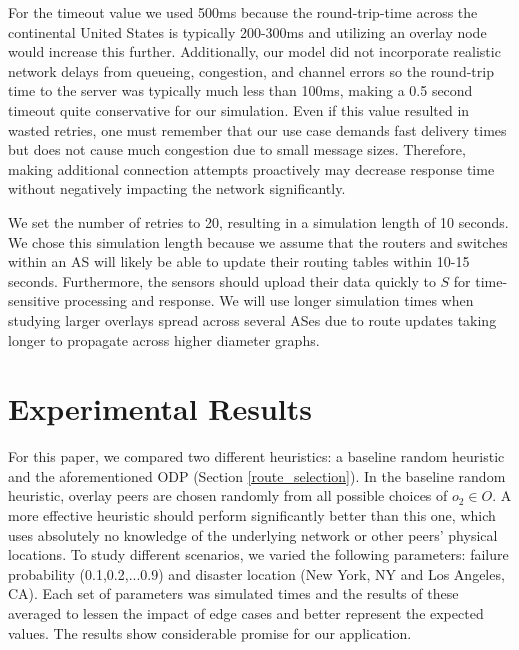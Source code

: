 \documentclass[conference]{IEEEtran}
\begin{document}
For the timeout value we used 500ms because the round-trip-time across the continental United States is typically 200-300ms and utilizing an overlay node would increase this further.
Additionally, our model did not incorporate realistic network delays from queueing, congestion, and channel errors so the round-trip time to the server was typically much less than 100ms, making a 0.5 second timeout quite conservative for our simulation.
Even if this value resulted in wasted retries, one must remember that our use case demands fast delivery times but does not cause much congestion due to small message sizes.
Therefore, making additional connection attempts proactively may decrease response time without negatively impacting the network significantly.

We set the number of retries to 20, resulting in a simulation length of 10 seconds.
We chose this simulation length because we assume that the routers and switches within an AS will likely be able to update their routing tables within 10-15 seconds.
Furthermore, the sensors should upload their data quickly to $S$ for time-sensitive processing and response.
We will use longer simulation times when studying larger overlays spread across several ASes due to route updates taking longer to propagate across higher diameter graphs.


\section{Experimental Results}
\label{results}

For this paper, we compared two different heuristics: a baseline random heuristic and the aforementioned ODP (Section \ref{route_selection}).
In the baseline random heuristic, overlay peers are chosen randomly from all possible choices of $o_2 \in O$.
A more effective heuristic should perform significantly better than this one, which uses absolutely no knowledge of the underlying network or other peers' physical locations.
To study different scenarios, we varied the following parameters: failure probability (0.1,0.2,...0.9) and disaster location (New York, NY and Los Angeles, CA). %
Each set of parameters was simulated \numruns times and the results of these averaged to lessen the impact of edge cases and better represent the expected values.
The results show considerable promise for our application.%
\end{document}
